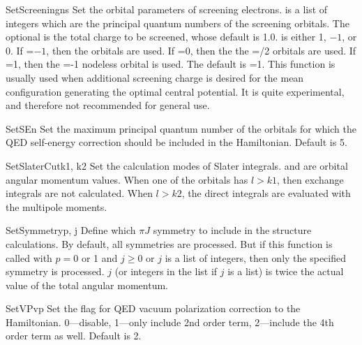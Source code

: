 \begin{fundesc}{SetScreening}{ns}
Set the orbital parameters of screening electrons.  is a list of
integers which are the principal quantum numbers of the screening
orbitals. The optional  is the total charge to be screened, whose
default is 1.0.  is either 1, $-1$, or 0. If =$-1$, then
the  orbitals are used. If =0, then the the =/2
orbitals are used. If =1, then the =-1 nodeless orbital
is used. The default is =1. This function is usually used when
additional screening charge is desired for the mean configuration generating
the optimal central potential. It is quite experimental, and therefore not
recommended for general use.
\end{fundesc}

\begin{fundesc}{SetSE}{n}
Set the maximum principal quantum number of the orbitals for which the QED
self-energy correction should be included in the Hamiltonian. Default is 5.
\end{fundesc}

\begin{fundesc}{SetSlaterCut}{k1, k2}
Set the calculation modes of Slater integrals.  and  are orbital
angular momentum values. When one of the orbitals has $l > k1$, then exchange
integrals are not calculated. When $l > k2$, the direct integrals are evaluated
with the multipole moments.
\end{fundesc}

\begin{fundesc}{SetSymmetry}{p, j}
Define which $\pi J$ symmetry to include in the structure calculations. By
default, all symmetries are processed. But if this function is called with $p=0$
or 1 and $j \ge 0$ or $j$ is a list of integers, then only the specified
symmetry is processed. $j$ (or integers in the list if $j$ is a list) is twice
the actual value of the total angular momentum.
\end{fundesc}

\begin{fundesc}{SetVP}{vp}
Set the flag for QED vacuum polarization correction to the Hamiltonian.
0---disable, 1---only include 2nd order term, 2---include the 4th order term as
well. Default is 2.
\end{fundesc}

